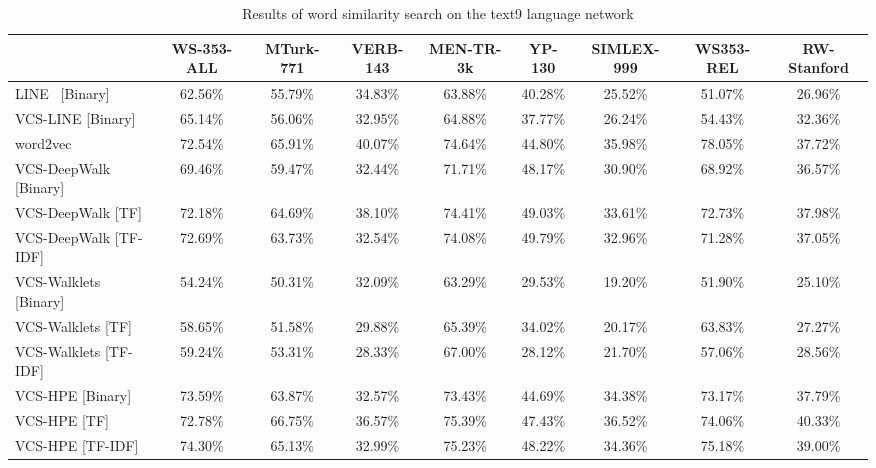 {
\begin{table*}%
\centering
\begin{tabular}{lcccccccc}
\toprule
 & {\small WS-353-ALL} & {\small MTurk-771} & {\small VERB-143}  & {\small MEN-TR-3k} & {\small YP-130} & {\small SIMLEX-999} & {\small WS353-REL} & {\small RW-Stanford} \\
\midrule
LINE~\cite{line} [Binary]   & 62.56\% & 55.79\% & 34.83\% & 63.88\% & 40.28\% & 25.52\% & 51.07\% & 26.96\% \\
VCS-LINE [Binary]           & 65.14\% & 56.06\% & 32.95\% & 64.88\% & 37.77\% & 26.24\% & 54.43\% & 32.36\% \\
\midrule
word2vec \cite{w2v}     & 72.54\% & 65.91\% & 40.07\% & 74.64\% & 44.80\% & 35.98\% & 78.05\% & 37.72\% \\
VCS-DeepWalk [Binary]   & 69.46\% & 59.47\% & 32.44\% & 71.71\% & 48.17\% & 30.90\% & 68.92\% & 36.57\% \\
VCS-DeepWalk [TF]       & 72.18\% & 64.69\% & 38.10\% & 74.41\% & 49.03\% & 33.61\% & 72.73\% & 37.98\% \\
VCS-DeepWalk [TF-IDF]   & 72.69\% & 63.73\% & 32.54\% & 74.08\% & 49.79\% & 32.96\% & 71.28\% & 37.05\% \\
\midrule
VCS-Walklets [Binary]   & 54.24\% & 50.31\% & 32.09\% & 63.29\% & 29.53\% & 19.20\% & 51.90\% & 25.10\% \\
VCS-Walklets [TF]       & 58.65\% & 51.58\% & 29.88\% & 65.39\% & 34.02\% & 20.17\% & 63.83\% & 27.27\% \\
VCS-Walklets [TF-IDF]   & 59.24\% & 53.31\% & 28.33\% & 67.00\% & 28.12\% & 21.70\% & 57.06\% & 28.56\% \\
\midrule
VCS-HPE [Binary]        & 73.59\% & 63.87\% & 32.57\% & 73.43\% & 44.69\% & 34.38\% & 73.17\% & 37.79\% \\
VCS-HPE [TF]            & 72.78\% & 66.75\% & 36.57\% & 75.39\% & 47.43\% & 36.52\% & 74.06\% & 40.33\% \\
VCS-HPE [TF-IDF]        & 74.30\% & 65.13\% & 32.99\% & 75.23\% & 48.22\% & 34.36\% & 75.18\% & 39.00\% \\
\bottomrule
\end{tabular}
\caption{Results of word similarity search on the text9 language network}
\label{tb:text9_word_sim}
\end{table*}%
}

